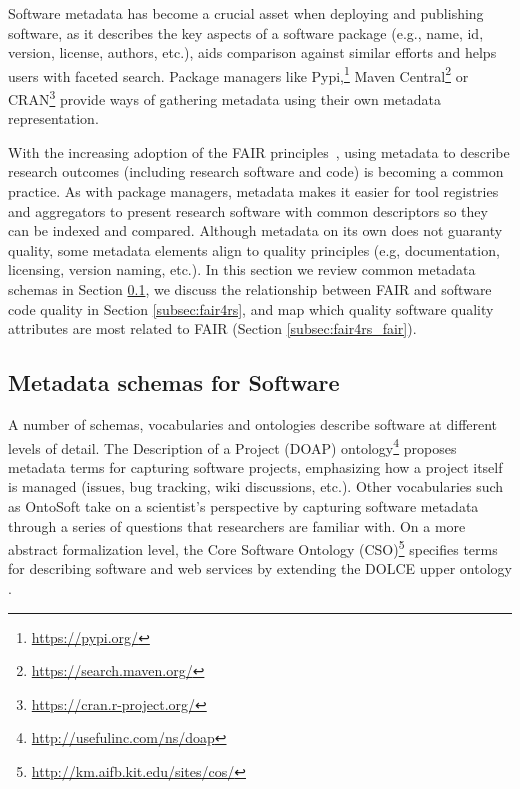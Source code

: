 
Software metadata has become a crucial asset when deploying and publishing software, as it describes the key aspects of a software package (e.g., name, id, version, license, authors, etc.), aids comparison against similar efforts and helps users with faceted search. Package managers like Pypi,\footnote{\url{https://pypi.org/}} Maven Central\footnote{\url{https://search.maven.org/}} or CRAN\footnote{\url{https://cran.r-project.org/}} provide ways of gathering metadata using their own metadata representation.

With the increasing adoption of the FAIR principles~\cite{wilkinson_fair_2016}, using metadata to describe research outcomes (including research software and code) is becoming a common practice. As with package managers, metadata makes it easier for tool registries and aggregators to present research software with common descriptors so they can be indexed and compared. Although metadata on its own does not guaranty quality, some metadata elements align to quality principles (e.g, documentation, licensing, version naming, etc.). In this section we review common metadata schemas in Section \ref{subsec:schemas}, we discuss the relationship between FAIR and software code quality in Section \ref{subsec:fair4rs}, and map  which quality software quality attributes are most related to FAIR (Section \ref{subsec:fair4rs_fair}).

\subsection{Metadata schemas for Software}
\label{subsec:schemas}

A number of schemas, vocabularies and ontologies describe software at different levels of detail. The Description of a Project (DOAP) ontology\footnote{\url{http://usefulinc.com/ns/doap}} proposes metadata terms for capturing software projects, emphasizing how a project itself is managed (issues, bug tracking, wiki discussions, etc.). Other vocabularies such as OntoSoft \cite{gil2016ontosoft} take on a scientist's perspective by capturing software metadata through a series of questions that researchers are familiar with. On a more abstract formalization level, the Core Software Ontology (CSO)\footnote{\url{http://km.aifb.kit.edu/sites/cos/}} specifies terms for describing software and web services by extending the DOLCE upper ontology \cite{gangemi2002sweetening}.

